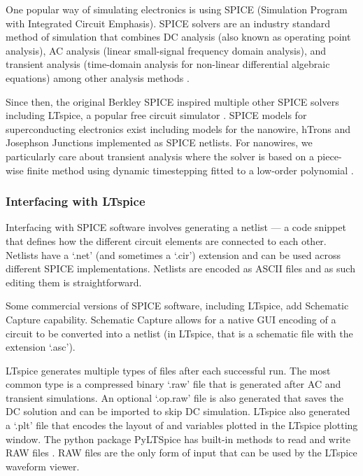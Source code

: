 \documentclass[]{article}
\newcommand{\ccf}[1]{`\textsf{#1}'}
\newcommand{\cf}[1]{\textsf{#1}}
\begin{document}
One popular way of simulating electronics is using SPICE 
(Simulation Program with Integrated Circuit Emphasis). 
SPICE solvers are an industry standard method of simulation that combines DC analysis (also known as
operating point analysis), AC analysis (linear small-signal frequency domain analysis), and 
transient analysis (time-domain analysis for non-linear differential algebraic equations)
among other analysis methods \cite{spice-og}.

Since then, the original Berkley SPICE
inspired multiple other SPICE solvers including LTspice, a popular free circuit simulator \cite{ltspice-diff-post}. SPICE models for 
superconducting electronics exist including models for the nanowire,
hTrons and Josephson Junctions implemented as SPICE netlists. For nanowires, we
particularly care about transient analysis where the solver
is based on a piece-wise finite method using dynamic timestepping fitted to a 
low-order polynomial \cite{spice-book}.

\subsubsection{Interfacing with LTspice}%
\label{interfacing_with_ltspice}

Interfacing with SPICE software involves generating a netlist --- a code snippet that defines
how the different circuit elements are connected to each other. Netlists have a \ccf{.net} (and 
sometimes a \ccf{.cir}) extension and can be used across different SPICE implementations. 
Netlists are encoded as ASCII files and as such editing them is straightforward.

Some commercial versions of SPICE
software, including LTspice, add Schematic Capture capability. Schematic Capture allows for a
native GUI encoding of a circuit to be converted into a netlist (in LTspice, that is a 
schematic file with the extension \ccf{.asc}).

LTspice generates multiple types of files after each successful run. The most common type is 
a compressed binary \ccf{.raw} file that is generated after AC and transient simulations. An
optional \ccf{.op.raw} file is also generated that saves the DC solution and can be imported
to skip DC simulation. LTspice also generated a \ccf{.plt} file that encodes the layout of and
variables plotted in the LTspice plotting window. The python package \cf{PyLTSpice}
has built-in methods to read and write RAW files \cite{pyltspice}. RAW files
are the only form of input that can be used by the LTspice waveform viewer.
\end{document}

